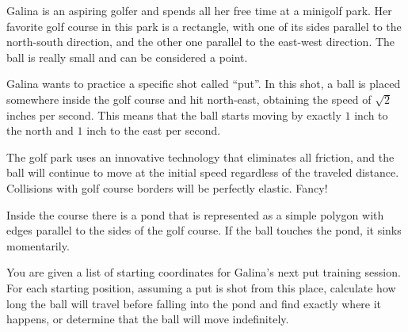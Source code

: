 Galina is an aspiring golfer and spends all her free time at a minigolf park. Her favorite golf course in this park is a rectangle, with one of its sides parallel to the north-south direction, and the other one parallel to the east-west direction. The ball is really small and can be considered a point.

Galina wants to practice a specific shot called ``put''. In this shot, a ball is placed somewhere inside the golf course and hit north-east, obtaining the speed of $\sqrt{2}$ inches per second. This means that the ball starts moving by exactly $1$ inch to the north and $1$ inch to the east per second. 

The golf park uses an innovative technology that eliminates all friction, and the ball will continue to move at the initial speed regardless of the traveled distance. Collisions with golf course borders will be perfectly elastic. Fancy!

Inside the course there is a pond that is represented as a simple polygon with edges parallel to the sides of the golf course. If the ball touches the pond, it sinks momentarily.

You are given a list of starting coordinates for Galina's next put training session. For each starting position, assuming a put is shot from this place, calculate how long the ball will travel before falling into the pond and find exactly where it happens, or determine that the ball will move indefinitely.